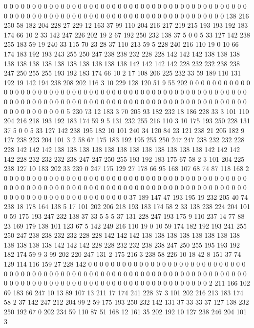 0 0 0 0 0 0 0 0 0 0 0 0 0 0 0 0 0 0 0 0
0 0 0 0 0 0 0 0 0 0 0 0 0 0 0 0 0 0 0 0
0 0 0 0 0 0 0 0 0 0 0 0 0 0 0 0 0 0 0 0
0 0 0 0 0 0 0 0 0 0 0 0 0 0 0 0 0 0 0 0
0 0 138 216 250 58 182 204 228 27 229 12 163 37 99 110 204 216 217 219
215 193 193 192 183 174 66 10 2 33 142 247 226 202 19 2 67 192 250 232
138 37 5 0 0 5 33 127 142 238 255 183 59 19 240 33 115 70 23 28
37 110 213 59 5 228 240 216 110 19 0 10 66 174 183 192 193 243 255 250
247 238 238 232 228 228 142 142 142 138 138 138 138 138 138 138 138 138 138 138
138 138 142 142 142 142 228 232 232 238 238 247 250 255 255 193 192 183 174 66
10 2 17 108 206 225 232 33 59 189 110 131 192 19 142 194 238 208 202 116
3 10 229 128 120 51 9 55 202 0 0 0 0 0 0 0 0 0 0 0
0 0 0 0 0 0 0 0 0 0 0 0 0 0 0 0 0 0 0 0
0 0 0 0 0 0 0 0 0 0 0 0 0 0 0 0 0 0 0 0
0 0 0 0 0 0 0 0 0 0 0 0 0 0 0 0 0 0 0 0
0 0 0 0 0 0 0 0 0 0 0 0 0 0 0 0 0 0 0 0
0 0 0 0 0 0 0 0 0 0 0 0 0 0 0 0 0 5 230 73
12 183 3 70 205 93 182 232 18 186 228 33 3 101 110 204 216 218 193 192
183 174 59 9 5 131 232 255 216 110 3 10 175 193 250 228 131 37 5 0
0 5 33 127 142 238 195 182 10 101 240 34 120 84 23 121 238 21 205 182
9 127 238 223 204 101 3 2 58 67 175 183 192 195 255 250 247 247 238 232
232 228 228 142 142 142 138 138 138 138 138 138 138 138 138 138 138 138 142 142
142 142 228 232 232 232 238 247 247 250 255 193 192 183 175 67 58 2 3 101
204 225 238 127 10 183 202 33 239 0 247 175 129 27 178 66 95 168 107 68
74 87 118 168 2 0 0 0 0 0 0 0 0 0 0 0 0 0 0 0
0 0 0 0 0 0 0 0 0 0 0 0 0 0 0 0 0 0 0 0
0 0 0 0 0 0 0 0 0 0 0 0 0 0 0 0 0 0 0 0
0 0 0 0 0 0 0 0 0 0 0 0 0 0 0 0 0 0 0 0
0 0 0 0 0 0 0 0 0 0 0 0 0 0 0 0 0 0 0 0
0 0 0 0 0 0 0 0 0 0 0 0 0 37 189 147 47 193 195 19
232 205 40 74 238 18 178 164 138 5 17 101 202 206 218 193 183 174 58 2
33 138 238 224 204 101 0 59 175 193 247 232 138 37 33 5 5 5 37 131
228 247 193 175 9 110 237 14 77 88 23 169 179 138 101 123 67 5 142 249
216 110 19 0 10 59 174 182 192 193 241 255 250 247 238 238 232 232 228 228
142 142 142 138 138 138 138 138 138 138 138 138 138 138 138 142 142 142 228 228
232 232 238 238 247 250 255 195 193 192 182 174 59 9 3 99 202 220 247 131
2 175 216 3 238 58 226 10 18 42 8 151 37 74 129 114 116 159 27 228
142 0 0 0 0 0 0 0 0 0 0 0 0 0 0 0 0 0 0 0
0 0 0 0 0 0 0 0 0 0 0 0 0 0 0 0 0 0 0 0
0 0 0 0 0 0 0 0 0 0 0 0 0 0 0 0 0 0 0 0
0 0 0 0 0 0 0 0 0 0 0 0 0 0 0 0 0 0 0 0
0 0 0 0 0 0 0 0 0 0 0 0 0 0 0 0 0 0 0 0
0 0 0 0 0 0 0 0 2 211 166 102 69 183 66 247 10 13 89 107
13 211 17 174 241 228 37 3 101 202 216 213 183 174 58 2 37 142 247 212
204 99 2 59 175 193 250 232 142 131 37 33 33 37 127 138 232 250 192 67
0 202 234 59 110 87 51 168 12 161 35 202 192 10 127 238 246 204 101 3
